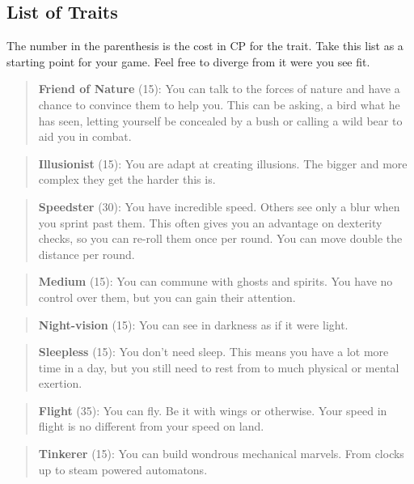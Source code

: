 \documentclass[11pt]{article}
\begin{document}
{\subsection{List of Traits}
\label{sec:orgf709dd8}
The number in the parenthesis is the cost in CP for the trait. Take this list as a starting point for your game. Feel free to diverge from it were you see fit.

\begin{quote}
\textbf{Friend of Nature} (15): You can talk to the forces of nature and have a chance to convince them to help you. This can be asking, a bird what he has seen, letting yourself be concealed by a bush or calling a wild bear to aid you in combat.
\end{quote}

\begin{quote}
\textbf{Illusionist} (15): You are adapt at creating illusions. The bigger and more complex they get the harder this is.
\end{quote}

\begin{quote}
\textbf{Speedster} (30): You have incredible speed. Others see only a blur when you sprint past them. This often gives you an advantage on dexterity checks, so you can re-roll them once per round. You can move double the distance per round.
\end{quote}

\begin{quote}
\textbf{Medium} (15): You can commune with ghosts and spirits. You have no control over them, but you can gain their attention.
\end{quote}

\begin{quote}
\textbf{Night-vision} (15): You can see in darkness as if it were light.
\end{quote}

\begin{quote}
\textbf{Sleepless} (15): You don't need sleep. This means you have a lot more time in a day, but you still need to rest from to much physical or mental exertion.
\end{quote}

\begin{quote}
\textbf{Flight} (35): You can fly. Be it with wings or otherwise. Your speed in flight is no different from your speed on land.
\end{quote}

\begin{quote}
\textbf{Tinkerer} (15): You can build wondrous mechanical marvels. From clocks up to steam powered automatons. 
\end{quote}

}
\end{document}
